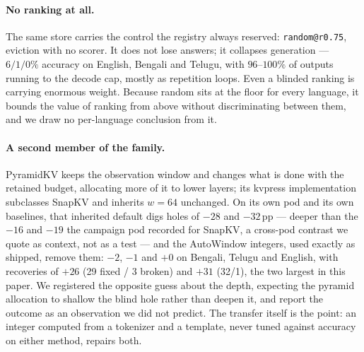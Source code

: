 \documentclass{article}
\begin{document}
\paragraph{No ranking at all.}
The same store carries the control the registry always reserved:
\texttt{random@r0.75}, eviction with no scorer. It does not lose
answers; it collapses generation --- $6/1/0\%$ accuracy on English,
Bengali and Telugu, with $96$--$100\%$ of outputs running to the decode
cap, mostly as repetition loops. Even a blinded ranking is carrying
enormous weight. Because random sits at the floor for every language, it
bounds the value of ranking from above without discriminating between
them, and we draw no per-language conclusion from it.

\paragraph{A second member of the family.}
PyramidKV \citep{cai2024pyramidkv} keeps the observation window and
changes what is done with the retained budget, allocating more of it to
lower layers; its kvpress implementation subclasses SnapKV and inherits
$w{=}64$ unchanged. On its own pod and its own baselines, that inherited
default digs holes of $-28$ and $-32$\,pp --- deeper
than the $-16$ and $-19$ the campaign pod recorded for SnapKV, a cross-pod
contrast we quote as context, not as a test --- and the AutoWindow integers,
used exactly as shipped, remove them: $-2$, $-1$ and $+0$ on Bengali,
Telugu and English, with recoveries of $+26$ (29 fixed / 3 broken) and
$+31$ (32/1), the two largest in this paper. We registered the opposite
guess about the depth, expecting the pyramid allocation to shallow the
blind hole rather than deepen it, and report the outcome as an
observation we did not predict. The transfer itself is the point: an
integer computed from a tokenizer and a template, never tuned against
accuracy on either method, repairs both.
\end{document}

